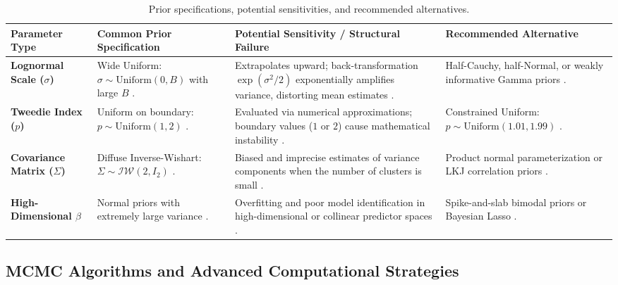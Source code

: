 \documentclass[11pt, a4paper]{article}
\begin{document}
\begin{table}[htbp]
\centering
\small
\caption{Prior specifications, potential sensitivities, and recommended alternatives.}
\label{tab:priors}
\begin{tabularx}{\textwidth}{l p{3.2cm} X X}
\toprule
\textbf{Parameter Type} & \textbf{Common Prior Specification} & \textbf{Potential Sensitivity / Structural Failure} & \textbf{Recommended Alternative} \\
\midrule
\textbf{Lognormal Scale ($\sigma$)} \cite{ref19, ref20} & Wide Uniform: $\sigma \sim \text{Uniform}(0, B)$ with large $B$ \cite{ref19, ref20}. & Extrapolates upward; back-transformation $\exp(\sigma^2/2)$ exponentially amplifies variance, distorting mean estimates \cite{ref19, ref20, ref37}. & Half-Cauchy, half-Normal, or weakly informative Gamma priors \cite{ref4, ref14}. \\
\addlinespace
\textbf{Tweedie Index ($p$)} \cite{ref11, ref26} & Uniform on boundary: $p \sim \text{Uniform}(1, 2)$ \cite{ref11, ref26}. & Evaluated via numerical approximations; boundary values ($1$ or $2$) cause mathematical instability \cite{ref38, ref39}. & Constrained Uniform: $p \sim \text{Uniform}(1.01, 1.99)$ \cite{ref39}. \\
\addlinespace
\textbf{Covariance Matrix ($\Sigma$)} \cite{ref1, ref40} & Diffuse Inverse-Wishart: $\Sigma \sim \mathcal{IW}(2, I_2)$ \cite{ref40}. & Biased and imprecise estimates of variance components when the number of clusters is small \cite{ref40}. & Product normal parameterization or LKJ correlation priors \cite{ref14, ref40}. \\
\addlinespace
\textbf{High-Dimensional $\beta$} \cite{ref34} & Normal priors with extremely large variance \cite{ref14, ref40}. & Overfitting and poor model identification in high-dimensional or collinear predictor spaces \cite{ref2, ref34}. & Spike-and-slab bimodal priors or Bayesian Lasso \cite{ref34, ref41}. \\
\bottomrule
\end{tabularx}
\end{table}

\subsection{MCMC Algorithms and Advanced Computational Strategies}
\end{document}
